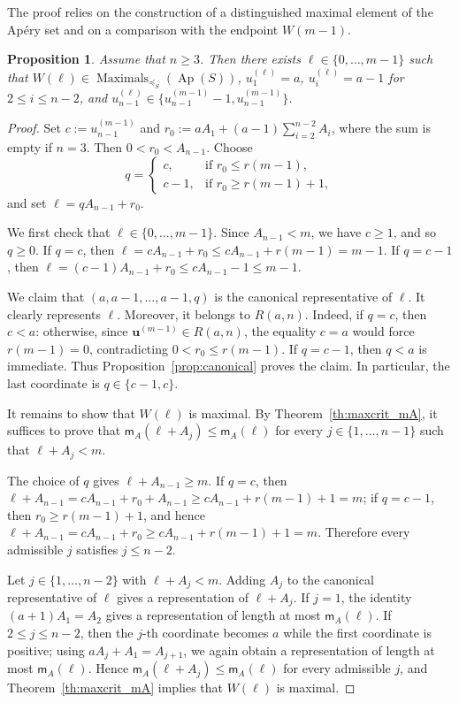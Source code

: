 \documentclass[12pt,a4paper]{amsart}
\newtheorem{proposition}[theorem]{Proposition}
\theoremstyle{definition}
\begin{document}
The proof relies on the construction of a distinguished maximal element of the Ap\'ery set and on a comparison with the endpoint $W(m-1)$.

\begin{proposition}\label{prop:vector_a_a-1}
Assume that $n\ge 3$. Then there exists $\ell\in\{0,\ldots,m-1\}$ such that $W(\ell) \in \operatorname{Maximals}_{\preceq_S}(\operatorname{Ap}(S))$, $u_1^{(\ell)}=a$, $u_i^{(\ell)}=a-1$ for $2\le i\le n-2$, and $u_{n-1}^{(\ell)}\in \{u_{n-1}^{(m-1)}-1,u_{n-1}^{(m-1)}\}$.
\end{proposition}

\begin{proof}
Set $c:=u_{n-1}^{(m-1)}$ and $r_0:=aA_1+(a-1)\sum_{i=2}^{n-2}A_i$, where the sum is empty if
$n=3$. Then $0<r_0<A_{n-1}$. Choose 
\[
q=
\begin{cases}
c, & \text{if } r_0\le r(m-1),\\
c-1, & \text{if } r_0\ge r(m-1)+1,
\end{cases}
\]
and set $\ell=qA_{n-1}+r_0$.

We first check that $\ell\in\{0,\ldots,m-1\}$. Since $A_{n-1}<m$, we
have $c\ge 1$, and so $q\ge 0$. If $q=c$, then
$\ell=cA_{n-1}+r_0\le cA_{n-1}+r(m-1)=m-1$. If $q=c-1$, then
$\ell=(c-1)A_{n-1}+r_0\le cA_{n-1}-1\le m-1$.

We claim that $(a,a-1,\ldots,a-1,q)$ is the canonical representative of
$\ell$. It clearly represents $\ell$. Moreover, it belongs to $R(a,n)$.
Indeed, if $q=c$, then $c<a$: otherwise, since
$\mathbf u^{(m-1)}\in R(a,n)$, the equality $c=a$ would force
$r(m-1)=0$, contradicting $0<r_0\le r(m-1)$. If $q=c-1$, then $q<a$
is immediate. Thus Proposition~\ref{prop:canonical} proves the claim. In particular, the last coordinate is $q\in\{c-1,c\}$.

It remains to show that $W(\ell)$ is maximal. By
Theorem~\ref{th:maxcrit_mA}, it suffices to prove that
$\mathsf m_A(\ell+A_j)\le \mathsf m_A(\ell)$ for every
$j\in\{1,\ldots,n-1\}$ such that $\ell+A_j<m$.

The choice of $q$ gives $\ell+A_{n-1}\ge m$. If $q=c$, then
$\ell+A_{n-1}=cA_{n-1}+r_0+A_{n-1}\ge cA_{n-1}+r(m-1)+1=m$; if
$q=c-1$, then $r_0\ge r(m-1)+1$, and hence
$\ell+A_{n-1}=cA_{n-1}+r_0\ge cA_{n-1}+r(m-1)+1=m$. Therefore every
admissible $j$ satisfies $j\le n-2$.

Let $j\in\{1,\ldots,n-2\}$ with $\ell+A_j<m$. Adding $A_j$ to the
canonical representative of $\ell$ gives a representation of
$\ell+A_j$. If $j=1$, the identity $(a+1)A_1=A_2$ gives a representation
of length at most $\mathsf m_A(\ell)$. If $2\le j\le n-2$, then the
$j$-th coordinate becomes $a$ while the first coordinate is positive;
using $aA_j+A_1=A_{j+1}$, we again obtain a representation of length at
most $\mathsf m_A(\ell)$. Hence
$\mathsf m_A(\ell+A_j)\le \mathsf m_A(\ell)$ for every admissible $j$,
and Theorem~\ref{th:maxcrit_mA} implies that $W(\ell)$ is maximal.
\end{proof}
\end{document}
